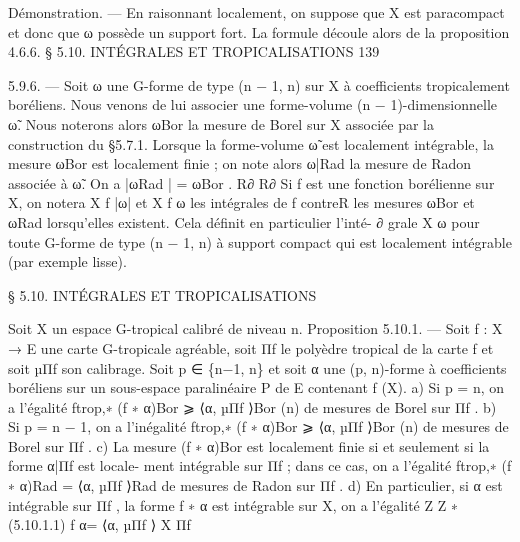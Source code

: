 \documentclass[
  10pt,
]{article}
\newenvironment{Shaded}{}{}
\newcommand{\NormalTok}[1]{#1}
\begin{document}
\begin{Shaded}
\begin{Highlighting}[]
\NormalTok{Démonstration. — En raisonnant localement, on suppose que X est paracompact et}
\NormalTok{donc que ω possède un support fort. La formule découle alors de la proposition 4.6.6.}
\NormalTok{                         § 5.10. INTÉGRALES ET TROPICALISATIONS                           139}

\NormalTok{5.9.6. — Soit ω une G{-}forme de type (n − 1, n) sur X à coefficients tropicalement}
\NormalTok{boréliens. Nous venons de lui associer une forme{-}volume (n − 1){-}dimensionnelle ω̃. Nous}
\NormalTok{noterons alors ωBor la mesure de Borel sur X associée par la construction du §5.7.1.}
\NormalTok{   Lorsque la forme{-}volume ω̃ est localement intégrable, la mesure ωBor est localement}
\NormalTok{finie ; on note alors ω|Rad la mesure de Radon associée à ω̃. On a |ωRad | = ωBor .}
\NormalTok{                                                     R∂         R∂}
\NormalTok{   Si f est une fonction borélienne sur X, on notera X f |ω| et X f ω les intégrales de f}
\NormalTok{contreR les mesures ωBor et ωRad lorsqu’elles existent. Cela définit en particulier l’inté{-}}
\NormalTok{         ∂}
\NormalTok{grale X ω pour toute G{-}forme de type (n − 1, n) à support compact qui est localement}
\NormalTok{intégrable (par exemple lisse).}



\NormalTok{               § 5.10. INTÉGRALES ET TROPICALISATIONS}

\NormalTok{  Soit X un espace G{-}tropical calibré de niveau n.}
\NormalTok{Proposition 5.10.1. — Soit f : X → E une carte G{-}tropicale agréable, soit Πf le}
\NormalTok{polyèdre tropical de la carte f et soit µΠf son calibrage.}
\NormalTok{  Soit p ∈ \{n−1, n\} et soit α une (p, n){-}forme à coefficients boréliens sur un sous{-}espace}
\NormalTok{paralinéaire P de E contenant f (X).}
\NormalTok{  a) Si p = n, on a l’égalité}
\NormalTok{                                   ftrop,∗ (f ∗ α)Bor ⩾ ⟨α, µΠf ⟩Bor}
\NormalTok{                             (n)}
\NormalTok{de mesures de Borel sur Πf .}
\NormalTok{  b) Si p = n − 1, on a l’inégalité}
\NormalTok{                                   ftrop,∗ (f ∗ α)Bor ⩾ ⟨α, µΠf ⟩Bor}
\NormalTok{                             (n)}
\NormalTok{de mesures de Borel sur Πf .}
\NormalTok{  c) La mesure (f ∗ α)Bor est localement finie si et seulement si la forme α|Πf est locale{-}}
\NormalTok{ment intégrable sur Πf ; dans ce cas, on a l’égalité}
\NormalTok{                                   ftrop,∗ (f ∗ α)Rad = ⟨α, µΠf ⟩Rad}
\NormalTok{de mesures de Radon sur Πf .}
\NormalTok{   d) En particulier, si α est intégrable sur Πf , la forme f ∗ α est intégrable sur X, on a}
\NormalTok{l’égalité}
\NormalTok{                                   Z         Z}
\NormalTok{                                        ∗}
\NormalTok{(5.10.1.1)                            f α=       ⟨α, µΠf ⟩}
\NormalTok{                                        X           Πf}


\end{Highlighting}
\end{Shaded}
\end{document}
